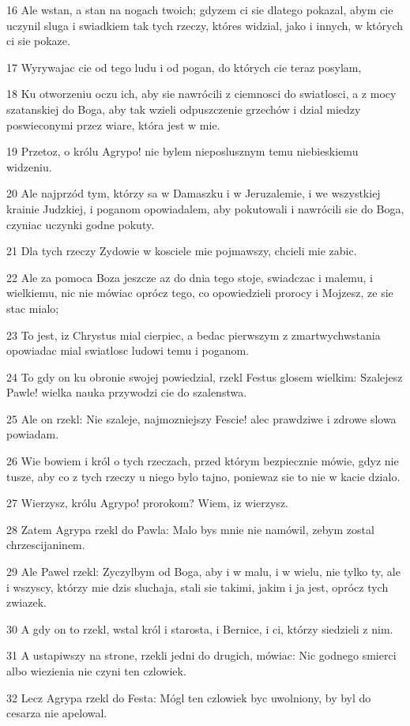 \par 16 Ale wstan, a stan na nogach twoich; gdyzem ci sie dlatego pokazal, abym cie uczynil sluga i swiadkiem tak tych rzeczy, któres widzial, jako i innych, w których ci sie pokaze.
\par 17 Wyrywajac cie od tego ludu i od pogan, do których cie teraz posylam,
\par 18 Ku otworzeniu oczu ich, aby sie nawrócili z ciemnosci do swiatlosci, a z mocy szatanskiej do Boga, aby tak wzieli odpuszczenie grzechów i dzial miedzy poswieconymi przez wiare, która jest w mie.
\par 19 Przetoz, o królu Agrypo! nie bylem nieposlusznym temu niebieskiemu widzeniu.
\par 20 Ale najprzód tym, którzy sa w Damaszku i w Jeruzalemie, i we wszystkiej krainie Judzkiej, i poganom opowiadalem, aby pokutowali i nawrócili sie do Boga, czyniac uczynki godne pokuty.
\par 21 Dla tych rzeczy Zydowie w kosciele mie pojmawszy, chcieli mie zabic.
\par 22 Ale za pomoca Boza jeszcze az do dnia tego stoje, swiadczac i malemu, i wielkiemu, nic nie mówiac oprócz tego, co opowiedzieli prorocy i Mojzesz, ze sie stac mialo;
\par 23 To jest, iz Chrystus mial cierpiec, a bedac pierwszym z zmartwychwstania opowiadac mial swiatlosc ludowi temu i poganom.
\par 24 To gdy on ku obronie swojej powiedzial, rzekl Festus glosem wielkim: Szalejesz Pawle! wielka nauka przywodzi cie do szalenstwa.
\par 25 Ale on rzekl: Nie szaleje, najmozniejszy Fescie! alec prawdziwe i zdrowe slowa powiadam.
\par 26 Wie bowiem i król o tych rzeczach, przed którym bezpiecznie mówie, gdyz nie tusze, aby co z tych rzeczy u niego bylo tajno, poniewaz sie to nie w kacie dzialo.
\par 27 Wierzysz, królu Agrypo! prorokom? Wiem, iz wierzysz.
\par 28 Zatem Agrypa rzekl do Pawla: Malo bys mnie nie namówil, zebym zostal chrzescijaninem.
\par 29 Ale Pawel rzekl: Zyczylbym od Boga, aby i w malu, i w wielu, nie tylko ty, ale i wszyscy, którzy mie dzis sluchaja, stali sie takimi, jakim i ja jest, oprócz tych zwiazek.
\par 30 A gdy on to rzekl, wstal król i starosta, i Bernice, i ci, którzy siedzieli z nim.
\par 31 A ustapiwszy na strone, rzekli jedni do drugich, mówiac: Nic godnego smierci albo wiezienia nie czyni ten czlowiek.
\par 32 Lecz Agrypa rzekl do Festa: Mógl ten czlowiek byc uwolniony, by byl do cesarza nie apelowal.

